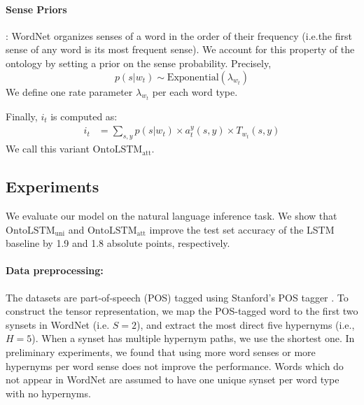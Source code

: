 \paragraph{Sense Priors}: WordNet organizes senses of a word in the order of their frequency (i.e.the first sense of any word is its most frequent sense). We account for this property of the ontology by setting a prior on the sense probability. Precisely,
\begin{equation*}
    p(s|w_t) \sim \text{Exponential}(\lambda_{w_t})
\end{equation*}
We define one rate parameter $\lambda_{w_t}$ per each word type.

Finally, $i_t$ is computed as:
\begin{align}
i_t &= \sum_{s, y} p(s|w_t) \times a_t^y(s,y) \times T_{w_t}(s,y) \nonumber
\end{align}
We call this variant \textbf{$\text{OntoLSTM}_{\text{att}}$}.

\subsection{Experiments}
\label{sec:ontolstm_experiments}
We evaluate our model on the natural language inference task.
We show that $\text{OntoLSTM}_{\text{uni}}$ and $\text{OntoLSTM}_{\text{att}}$ improve the test set accuracy of the LSTM baseline by 1.9 and 1.8 absolute points, respectively.

\paragraph{Data preprocessing:} The datasets are part-of-speech (POS) tagged using Stanford's POS tagger \citep{toutanova:03}.
To construct the tensor representation, we map the POS-tagged word to the first two synsets in WordNet (i.e. $S=2$), and extract the most direct five hypernyms (i.e., $H=5$). When a synset has multiple hypernym paths, we use the shortest one. In preliminary experiments, we found that using more word senses or more hypernyms per word sense does not improve the performance.
Words which do not appear in WordNet are assumed to have one unique synset per word type with no hypernyms.

